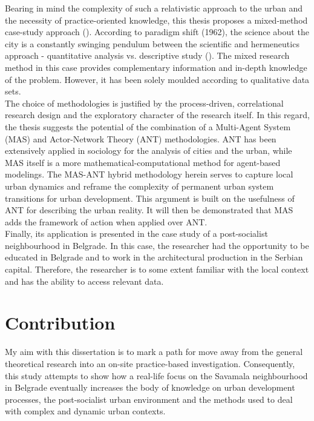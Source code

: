 \documentclass[11pt]{report}
\begin{document}
{{Bearing in mind the complexity of such a relativistic approach to the urban and the necessity of practice-oriented knowledge, this thesis proposes a mixed-method case-study approach (\href{ref}{\citealt{denzin_case_2005}}). According to \href{Kuhn}{\cite{kuhn_structure_1962}} paradigm shift (1962), the science about the city is a constantly swinging pendulum between the scientific and hermeneutics approach - quantitative analysis vs. descriptive study (\href{ref}{\citealt{portugali_complexity_2011}}). The mixed research method in this case provides complementary information and in-depth knowledge of the problem. However, it has been solely moulded according to qualitative data sets. 
\\

The choice of methodologies is justified by the process-driven, correlational research design and the exploratory character of the research itself. In this regard, the thesis suggests the potential of the combination of a Multi-Agent System (MAS) and Actor-Network Theory (ANT) methodologies. ANT has been extensively applied in sociology for the analysis of cities and the urban, while MAS itself is a more mathematical-computational method for agent-based modelings. The MAS-ANT hybrid methodology herein serves to capture local urban dynamics and reframe the complexity of permanent urban system transitions for urban development. This argument is built on the usefulness of ANT for describing the urban reality. It will then be demonstrated that MAS adds the framework of action when applied over ANT.
\\

Finally, its application is presented in the case study of a post-socialist neighbourhood in Belgrade. In this case, the researcher had the opportunity to be educated in Belgrade and to work in the architectural production in the Serbian capital. Therefore, the researcher is to some extent familiar with the local context and has the ability to access relevant data.

\section{Contribution}

My aim with this dissertation is to mark a path for move away from the general theoretical research into an on-site practice-based investigation. Consequently, this study attempts to show how a real-life focus on the Savamala neighbourhood in Belgrade eventually increases the body
of knowledge on urban development processes, the post-socialist urban environment and the methods used to deal with complex and dynamic urban contexts.
\\

}}
\end{document}
